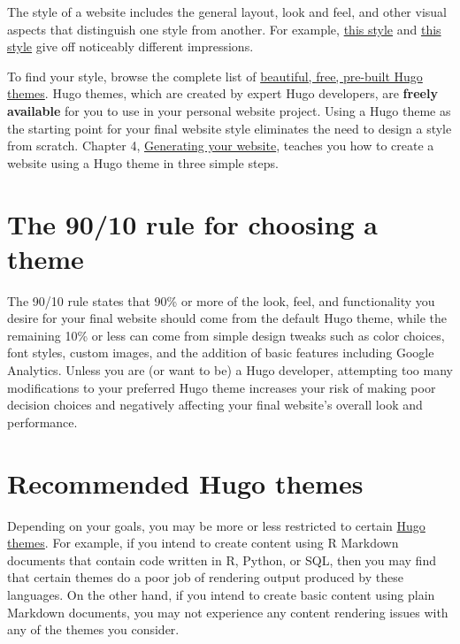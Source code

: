 \documentclass[
]{book}
\begin{document}
The style of a website includes the general layout, look and feel, and other visual aspects that distinguish one style from another. For example, \href{https://themes.gohugo.io/vex-hugo/}{this style} and \href{https://themes.gohugo.io/hugo-split-theme/}{this style} give off noticeably different impressions.

To find your style, browse the complete list of \href{https://themes.gohugo.io/}{beautiful, free, pre-built Hugo themes}. Hugo themes, which are created by expert Hugo developers, are \textbf{freely available} for you to use in your personal website project. Using a Hugo theme as the starting point for your final website style eliminates the need to design a style from scratch. Chapter 4, \protect\hyperlink{generate}{Generating your website}, teaches you how to create a website using a Hugo theme in three simple steps.

\hypertarget{the-9010-rule-for-choosing-a-theme}{%
\section{The 90/10 rule for choosing a theme}\label{the-9010-rule-for-choosing-a-theme}}

The 90/10 rule states that 90\% or more of the look, feel, and functionality you desire for your final website should come from the default Hugo theme, while the remaining 10\% or less can come from simple design tweaks such as color choices, font styles, custom images, and the addition of basic features including Google Analytics. Unless you are (or want to be) a Hugo developer, attempting too many modifications to your preferred Hugo theme increases your risk of making poor decision choices and negatively affecting your final website's overall look and performance.

\hypertarget{recommended-hugo-themes}{%
\section{Recommended Hugo themes}\label{recommended-hugo-themes}}

Depending on your goals, you may be more or less restricted to certain \href{https://themes.gohugo.io/}{Hugo themes}. For example, if you intend to create content using R Markdown documents that contain code written in R, Python, or SQL, then you may find that certain themes do a poor job of rendering output produced by these languages. On the other hand, if you intend to create basic content using plain Markdown documents, you may not experience any content rendering issues with any of the themes you consider.
\end{document}

